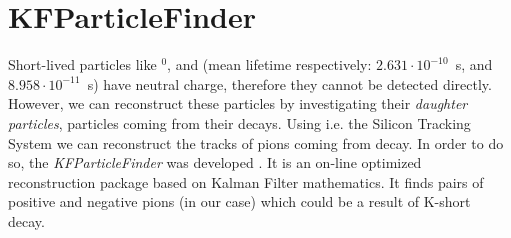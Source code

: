 \documentclass[12pt,a4paper]{report}
\begin{document}
\section{KFParticleFinder}
Short-lived particles like \PLambda$^0$, and \PKshort (mean lifetime respectively: $2.631 \cdot 10^{-10}$~s, and $8.958\cdot 10^{-11}$~s) have neutral charge, therefore they cannot be detected directly. However, we can reconstruct these particles by investigating their \emph{daughter particles}, particles coming from their decays. Using i.e. the Silicon Tracking System we can reconstruct the tracks of pions coming from \PKshort decay. In order to do so, the \emph{KFParticleFinder} was developed \cite{kfp}. It is an on-line optimized reconstruction package based on Kalman Filter mathematics. It finds pairs of positive and negative pions (in our case) which could be a result of K-short decay. 
\end{document}
